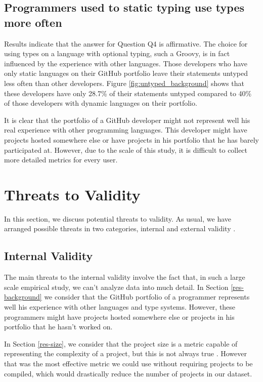 \documentclass[preprint]{sigplanconf}
\begin{document}
\subsection{Programmers used to static typing use types more often\label{discussion-q4}}
Results indicate that the answer for Question Q4 is affirmative.
The choice for using types on a language with optional typing, such a Groovy, is in fact influenced by the experience  with other languages.
Those developers who have only static languages on their GitHub portfolio leave their statements untyped less often than other developers.
Figure \ref{fig:untyped_background} shows that these developers have only 28.7\% of their statements untyped compared to 40\% of those developers with dynamic languages on their portfolio. 

It is clear that the portfolio of a GitHub developer might not represent well his real experience with other programming languages.
This developer might have projects hosted somewhere else or have projects in his portfolio that he has barely participated at.
However, due to the scale of this study, it is difficult to collect more detailed metrics for every user.











%
%
\section{Threats to Validity\label{threats}}
In this section, we discuss potential threats to validity. As usual, we have arranged possible threats in two categories, internal and external validity \cite{Wohlin2012}. 

\subsection*{Internal Validity}
The main threats to the internal validity involve the fact that, in such a large scale empirical study, we can't analyze data into much detail. In Section \ref{res-background} we consider that the GitHub portfolio of a programmer represents well his experience with other languages and type systems.
However, these programmers might have projects hosted somewhere else or projects in his portfolio that he hasn't worked on.

In Section \ref{res-size}, we consider that the project size is a metric capable of representing the complexity of a project, but this is not always true \cite{Fenton1998}.
However that was the most effective metric we could use without requiring projects to be compiled, which would drastically reduce the number of projects in our dataset.
\end{document}
